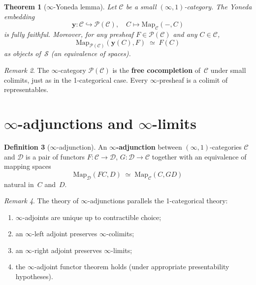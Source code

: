 \documentclass[a4paper,12pt]{book}
\theoremstyle{definition}
\newtheorem{definition}{Definition}[section]
\theoremstyle{plain}
\newtheorem{theorem}[definition]{Theorem}
\theoremstyle{remark}
\newtheorem{remark}[definition]{Remark}
\begin{document}
\begin{theorem}[$\infty$-Yoneda lemma]\label{thm:infty-yoneda}
Let $\mathcal{C}$ be a small $(\infty,1)$-category.  The Yoneda embedding
\[
    \mathbf{y}\colon \mathcal{C}\hookrightarrow\mathcal{P}(\mathcal{C}),
    \quad C\mapsto\mathrm{Map}_\mathcal{C}(-,C)
\]
is fully faithful.  Moreover, for any presheaf
$F\in\mathcal{P}(\mathcal{C})$ and any $C\in\mathcal{C}$,
\[
    \mathrm{Map}_{\mathcal{P}(\mathcal{C})}(\mathbf{y}(C), F)
    \;\simeq\; F(C)
\]
as objects of~$\mathcal{S}$ (an equivalence of spaces).
\end{theorem}

\begin{remark}\label{rem:infty-yoneda-universal}
The $\infty$-category $\mathcal{P}(\mathcal{C})$ is the
\textbf{free cocompletion} of~$\mathcal{C}$ under small colimits,
just as in the 1-categorical case.  Every $\infty$-presheaf is a
colimit of representables.
\end{remark}



\section{$\infty$-adjunctions and $\infty$-limits}\label{sec:infty-adj}


\begin{definition}[$\infty$-adjunction]\label{def:infty-adjunction}
An \textbf{$\infty$-adjunction} between $(\infty,1)$-categories
$\mathcal{C}$ and $\mathcal{D}$ is a pair of functors
$F\colon\mathcal{C}\to\mathcal{D}$, $G\colon\mathcal{D}\to\mathcal{C}$
together with an equivalence of mapping spaces
\[
    \mathrm{Map}_\mathcal{D}(FC, D)
    \;\simeq\;
    \mathrm{Map}_\mathcal{C}(C, GD)
\]
natural in~$C$ and~$D$.
\end{definition}

\begin{remark}\label{rem:infty-adjunction-properties}
The theory of $\infty$-adjunctions parallels the 1-categorical theory:
\begin{enumerate}[label=(\roman*)]
\item $\infty$-adjoints are unique up to contractible choice;
\item an $\infty$-left adjoint preserves $\infty$-colimits;
\item an $\infty$-right adjoint preserves $\infty$-limits;
\item the $\infty$-adjoint functor theorem holds (under appropriate
      presentability hypotheses).
\end{enumerate}
\end{remark}
\end{document}
